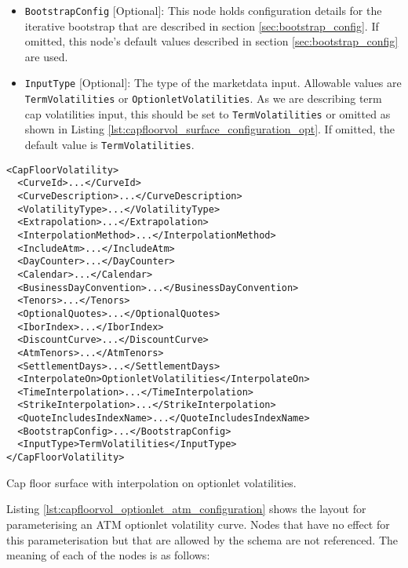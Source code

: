 \begin{itemize}
\item \lstinline!BootstrapConfig! [Optional]:
This node holds configuration details for the iterative bootstrap that are described in section \ref{sec:bootstrap_config}. If omitted, this node's default values described in section \ref{sec:bootstrap_config} are used.

\item \lstinline!InputType! [Optional]:
The type of the marketdata input. Allowable values are \lstinline!TermVolatilities! or \lstinline!OptionletVolatilities!. As we are describing term cap volatilities input, this should be set to \lstinline!TermVolatilities! or omitted as shown in Listing \ref{lst:capfloorvol_surface_configuration_opt}. If omitted, the default value is \lstinline!TermVolatilities!.

\end{itemize}

\begin{longlisting}
\begin{verbatim}
<CapFloorVolatility>
  <CurveId>...</CurveId>
  <CurveDescription>...</CurveDescription>
  <VolatilityType>...</VolatilityType>
  <Extrapolation>...</Extrapolation>
  <InterpolationMethod>...</InterpolationMethod>
  <IncludeAtm>...</IncludeAtm>
  <DayCounter>...</DayCounter>
  <Calendar>...</Calendar>
  <BusinessDayConvention>...</BusinessDayConvention>
  <Tenors>...</Tenors>
  <OptionalQuotes>...</OptionalQuotes>
  <IborIndex>...</IborIndex>
  <DiscountCurve>...</DiscountCurve>
  <AtmTenors>...</AtmTenors>
  <SettlementDays>...</SettlementDays>
  <InterpolateOn>OptionletVolatilities</InterpolateOn>
  <TimeInterpolation>...</TimeInterpolation>
  <StrikeInterpolation>...</StrikeInterpolation>
  <QuoteIncludesIndexName>...</QuoteIncludesIndexName>
  <BootstrapConfig>...</BootstrapConfig>
  <InputType>TermVolatilities</InputType>
</CapFloorVolatility>
\end{verbatim}
\caption{Cap floor surface with interpolation on optionlet volatilities.}
\label{lst:capfloorvol_surface_configuration_opt}
\end{longlisting}

Listing \ref{lst:capfloorvol_optionlet_atm_configuration} shows the layout for parameterising an ATM optionlet volatility curve. Nodes that have no effect for this parameterisation but that are allowed by the schema are not referenced. The meaning of each of the nodes is as follows:

